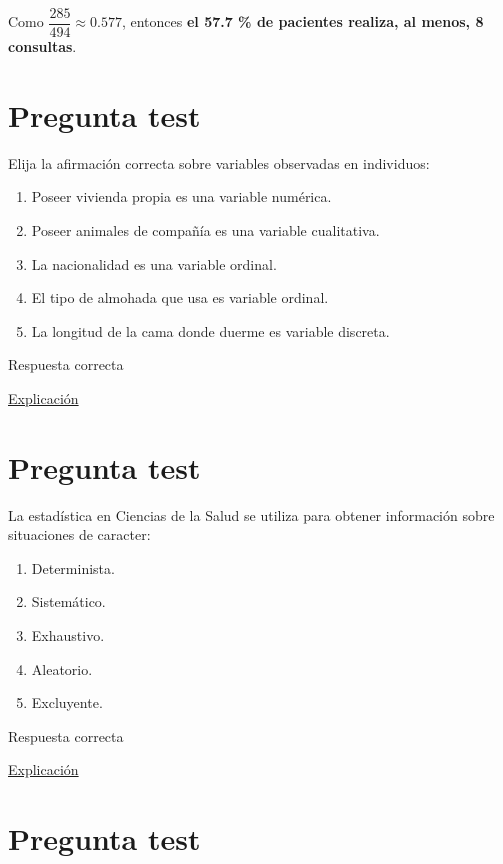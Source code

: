 \documentclass[
]{book}
\providecommand{\tightlist}{%
  \setlength{\itemsep}{0pt}\setlength{\parskip}{0pt}}
\begin{document}
Como \(\dfrac{285}{494} \approx 0.577\), entonces \textbf{el 57.7 \% de pacientes realiza, al menos, 8 consultas}.

\hypertarget{pregunta-test-8}{%
\section{Pregunta test}\label{pregunta-test-8}}

Elija la afirmación correcta sobre variables observadas en individuos:

\begin{enumerate}
\def\labelenumi{\alph{enumi})}
\tightlist
\item
  Poseer vivienda propia es una variable numérica.
\item
  Poseer animales de compañía es una variable cualitativa.
\item
  La nacionalidad es una variable ordinal.
\item
  El tipo de almohada que usa es variable ordinal.
\item
  La longitud de la cama donde duerme es variable discreta.
\end{enumerate}

Respuesta correcta

\href{https://1fjmanzano.github.io/bioestadistica/tipos-de-variables.html}{Explicación}

\hypertarget{pregunta-test-9}{%
\section{Pregunta test}\label{pregunta-test-9}}

La estadística en Ciencias de la Salud se utiliza para obtener información sobre situaciones de caracter:

\begin{enumerate}
\def\labelenumi{\alph{enumi})}
\tightlist
\item
  Determinista.
\item
  Sistemático.
\item
  Exhaustivo.
\item
  Aleatorio.
\item
  Excluyente.
\end{enumerate}

Respuesta correcta

\href{https://1fjmanzano.github.io/bioestadistica/inferencia-estad\%C3\%ADstica.html}{Explicación}

\hypertarget{pregunta-test-10}{%
\section{Pregunta test}\label{pregunta-test-10}}
\end{document}
